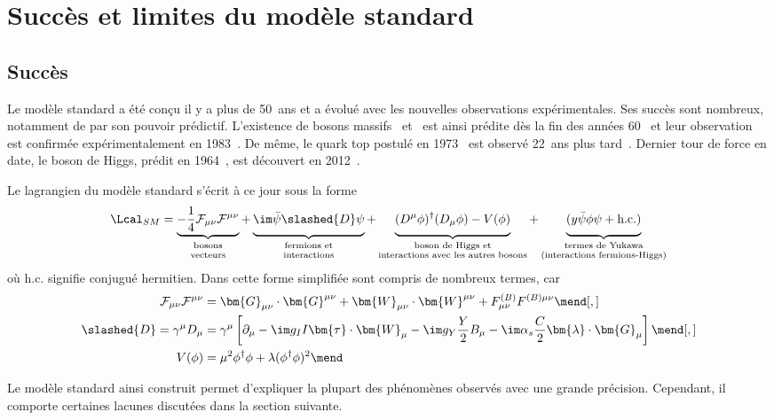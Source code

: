 \section{Succès et limites du modèle standard}\label{chapter-MS-MSSM-section-succes_limites}
\subsection{Succès}\label{chapter-MS-MSSM-section-succes_limites-subsec-succes}
Le modèle standard a été conçu il y a plus de 50~ans et a évolué avec les nouvelles observations expérimentales.
Ses succès sont nombreux, notamment de par son pouvoir prédictif.
L'existence de bosons massifs \Wboson\ et \Zboson\ est ainsi prédite dès la fin des années 60~\cite{Weinberg_leptons_model} et leur observation est confirmée expérimentalement en 1983~\cite{Wboson_discovery1,Wboson_discovery2,Wboson_discovery3,Zboson_discovery1,Zboson_discovery2}.
De même, le quark top postulé en 1973~\cite{CKM_KM} est observé 22~ans plus tard~\cite{top_discovery1,top_discovery2}.
Dernier tour de force en date, le boson de Higgs, prédit en 1964~\cite{Englert_Brout,Higgs_1,Higgs_2,Guralnik_Hagen_Kibble}, est découvert en 2012~\cite{ATLAS_Higgs_discovery,CMS_Higgs_discovery}.
\par Le lagrangien du modèle standard s'écrit à ce jour sous la forme
\begin{equation}
\Lcal_{SM} = 
\underbrace{- \frac{1}{4} \mathcal{F}_{\mu\nu}\mathcal{F}^{\mu\nu} \vphantom{\frac{1}{4}}}_{\substack{\text{bosons\vphantom{YHg}}\\\text{vecteurs\vphantom{(lHg)}}}}
+ \underbrace{\im \bar{\psi} \slashed{D} \psi \vphantom{\frac{1}{4}}}_{\substack{\text{fermions et\vphantom{YHg}}\\\text{interactions\vphantom{(lHg)}}}}
+ \underbrace{(D^\mu\phi)^\dagger(D_\mu\phi) - V(\phi) \vphantom{\frac{1}{4}}}_{\substack{\text{boson de Higgs et\vphantom{YHg}}\\\text{interactions avec les autres bosons\vphantom{(lHg)}}}}
+ \underbrace{(y \bar{\psi}\phi\psi + \text{h.c.}) \vphantom{\frac{1}{4}}}_{\substack{\text{termes de Yukawa\vphantom{YHg}}\\\text{(interactions fermions-Higgs)\vphantom{(lHg)}}}}
\label{eq-SM_lagrangian}
\end{equation}
où \og $\text{h.c.}$ \fg{} signifie conjugué hermitien.
Dans cette forme simplifiée sont compris de nombreux termes, car
\begin{align}
\mathcal{F}_{\mu\nu}\mathcal{F}^{\mu\nu} &= \bm{G}_{\mu\nu} \cdot \bm{G}^{\mu\nu} + \bm{W}_{\mu\nu} \cdot \bm{W}^{\mu\nu} + F^{(B)}_{\mu\nu} F^{(B)\mu\nu}
\mend[,]\\
\slashed{D} = \gamma^\mu D_\mu &= \gamma^\mu \left[ \partial_\mu - \im g_I I \bm{\tau}\cdot\bm{W}_\mu - \im g_Y \frac{Y}{2} B_\mu - \im \alpha_s \frac{C}{2} \bm{\lambda}\cdot\bm{G}_\mu \right]
\mend[,]\\
V(\phi) &= \mu^2\phi^\dagger\phi + \lambda (\phi^\dagger\phi)^2
\mend
\end{align}
\par Le modèle standard ainsi construit permet d'expliquer la plupart des phénomènes observés avec une grande précision.
Cependant, il comporte certaines lacunes discutées dans la section suivante.
